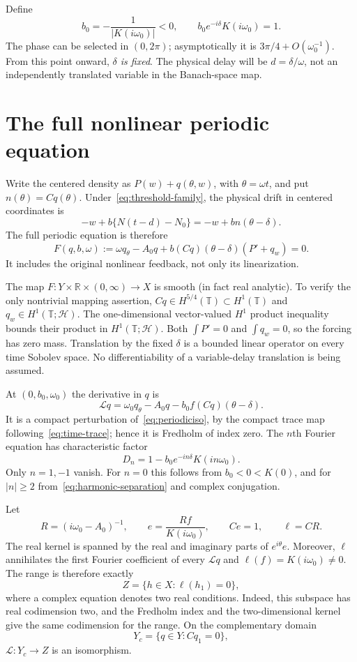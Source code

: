 \documentclass[11pt,a4paper]{article}
\numberwithin{equation}{section}
\theoremstyle{remark}\newtheorem{remark}[theorem]{Remark}
\newcommand{\R}{\mathbb R}\newcommand{\C}{\mathbb C}\newcommand{\T}{\mathbb T}
\newcommand{\HH}{\mathcal H}\newcommand{\DD}{\mathcal D}
\begin{document}
Define
\begin{equation}\label{eq:criticalparams}
 b_0=-\frac1{|K(i\omega_0)|}<0,
 \qquad b_0e^{-i\delta}K(i\omega_0)=1.
\end{equation}
The phase can be selected in $(0,2\pi)$; asymptotically it is $3\pi/4+O(\omega_0^{-1})$. From this point onward, \emph{$\delta$ is fixed}. The physical delay will be $d=\delta/\omega$, not an independently translated variable in the Banach-space map.

\section{The full nonlinear periodic equation}
Write the centered density as $P(w)+q(\theta,w)$, with $\theta=\omega t$, and put $n(\theta)=Cq(\theta)$. Under~\eqref{eq:threshold-family}, the physical drift in centered coordinates is
\[
 -w+b\{N(t-d)-N_0\}=-w+b n(\theta-\delta).
\]
The full periodic equation is therefore
\begin{equation}\label{eq:nonlinearF}
 F(q,b,\omega):=\omega q_\theta-A_0q
       +b(Cq)(\theta-\delta)(P'+q_w)=0.
\end{equation}
It includes the original nonlinear feedback, not only its linearization.

The map $F:Y\times\R\times(0,\infty)\to X$ is smooth (in fact real analytic). To verify the only nontrivial mapping assertion, $Cq\in H^{5/4}(\T)\subset H^1(\T)$ and $q_w\in H^1(\T;\HH)$. The one-dimensional vector-valued $H^1$ product inequality bounds their product in $H^1(\T;\HH)$. Both $\int P'=0$ and $\int q_w=0$, so the forcing has zero mass. Translation by the fixed $\delta$ is a bounded linear operator on every time Sobolev space. No differentiability of a variable-delay translation is being assumed.

At $(0,b_0,\omega_0)$ the derivative in $q$ is
\[
 \mathcal Lq=\omega_0q_\theta-A_0q
             -b_0f(Cq)(\theta-\delta).
\]
It is a compact perturbation of~\eqref{eq:periodiciso}, by the compact trace map following~\eqref{eq:time-trace}; hence it is Fredholm of index zero. The $n$th Fourier equation has characteristic factor
\begin{equation}\label{eq:charfactor}
 D_n=1-b_0e^{-in\delta}K(in\omega_0).
\end{equation}
Only $n=1,-1$ vanish. For $n=0$ this follows from $b_0<0<K(0)$, and for $|n|\geq2$ from~\eqref{eq:harmonic-separation} and complex conjugation.

Let
\[
 R=(i\omega_0-A_0)^{-1},\qquad
 e=\frac{Rf}{K(i\omega_0)},\qquad Ce=1,
 \qquad \ell=CR.
\]
The real kernel is spanned by the real and imaginary parts of $e^{i\theta}e$. Moreover, $\ell$ annihilates the first Fourier coefficient of every $\mathcal Lq$ and $\ell(f)=K(i\omega_0)\ne0$. The range is therefore exactly
\[
 Z=\{h\in X:\ell(h_1)=0\},
\]
where a complex equation denotes two real conditions. Indeed, this subspace has real codimension two, and the Fredholm index and the two-dimensional kernel give the same codimension for the range. On the complementary domain
\[
 Y_c=\{q\in Y:Cq_1=0\},
\]
$\mathcal L:Y_c\to Z$ is an isomorphism.
\end{document}
